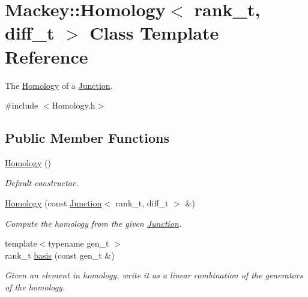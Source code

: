 \hypertarget{classMackey_1_1Homology}{}\section{Mackey\+:\+:Homology$<$ rank\+\_\+t, diff\+\_\+t $>$ Class Template Reference}
\label{classMackey_1_1Homology}


The \hyperlink{classMackey_1_1Homology}{Homology} of a \hyperlink{classMackey_1_1Junction}{Junction}.  




{\ttfamily \#include $<$Homology.\+h$>$}

\subsection*{Public Member Functions}
\begin{DoxyCompactItemize}
\item 
\hyperlink{classMackey_1_1Homology_a3580b194f986bd59a02fb84db97e00f2}{Homology} ()
\begin{DoxyCompactList}\small\item\em Default constructor. \end{DoxyCompactList}\item 
\hyperlink{classMackey_1_1Homology_a31e26f0fb8e1cd7f0506ae1dbc97ea22}{Homology} (const \hyperlink{classMackey_1_1Junction}{Junction}$<$ rank\+\_\+t, diff\+\_\+t $>$ \&)
\begin{DoxyCompactList}\small\item\em Compute the homology from the given \hyperlink{classMackey_1_1Junction}{Junction}. \end{DoxyCompactList}\item 
{\footnotesize template$<$typename gen\+\_\+t $>$ }\\rank\+\_\+t \hyperlink{classMackey_1_1Homology_a3ef6bc9a9859c3711c11d153ba55b3e1}{basis} (const gen\+\_\+t \&)
\begin{DoxyCompactList}\small\item\em Given an element in homology, write it as a linear combination of the generators of the homology. \end{DoxyCompactList}\end{DoxyCompactItemize}

